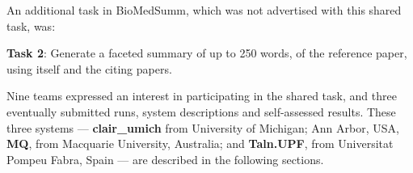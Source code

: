 \documentclass[11pt]{article}
\begin{document}
An additional task in BioMedSumm, which was not advertised with this shared task, was:

{\bf Task 2}: Generate a faceted summary of up to 250 words, of the 
reference paper, using itself and the citing papers.

Nine teams expressed an interest in participating in the shared task,
and three eventually submitted runs, system descriptions and
self-assessed results.  These three systems --- {\bf clair\_umich}
from University of Michigan; Ann Arbor, USA, {\bf MQ}, from Macquarie
University, Australia; and {\bf Taln.UPF}, from Universitat Pompeu
Fabra, Spain --- are described in the following sections.


\end{document}
